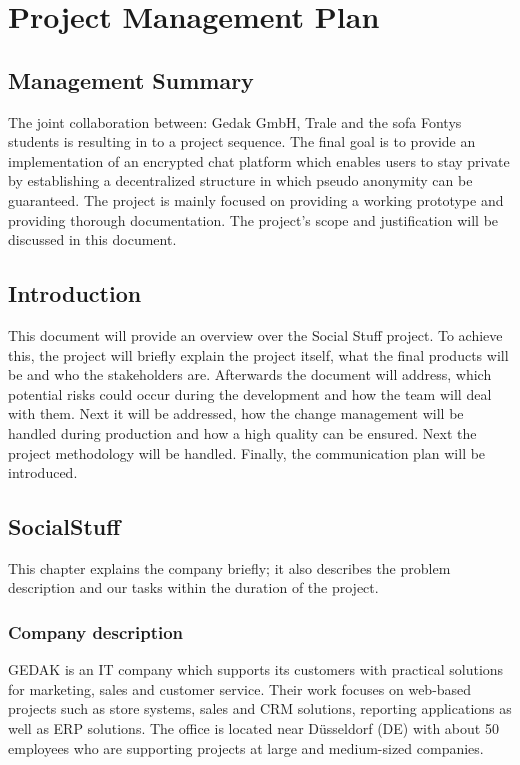 \section{Project Management Plan}\label{sec:project-management-plan}

\subsection{Management Summary}\label{subsec:management-summary}

The joint collaboration between: Gedak GmbH, Trale and the \ac{sofa} Fontys students is resulting in to a project
sequence.
The final goal is to provide an implementation of an encrypted chat platform which enables users to stay private by
establishing a decentralized structure in which pseudo anonymity can be guaranteed.
The project is mainly focused on providing a working prototype and providing thorough documentation.
The project's scope and justification will be discussed in this document.

\subsection{Introduction}\label{subsec:introduction}
This document will provide an overview over the Social Stuff project.
To achieve this, the project will briefly explain the project itself, what the final products will be and who the
stakeholders are.
Afterwards the document will address, which potential risks could occur during the development and how the team will
deal with them.
Next it will be addressed, how the change management will be handled during production and how a high quality can be
ensured.
Next the project methodology will be handled.
Finally, the communication plan will be introduced.

\subsection{SocialStuff}\label{subsec:socialstuff}

This chapter explains the company briefly;
it also describes the problem description and our tasks within the duration of the project.

\subsubsection{Company description}

GEDAK is an IT company which supports its customers with practical solutions for marketing, sales and customer service.
Their work focuses on web-based projects such as store systems, sales and CRM solutions, reporting applications as well
as ERP solutions.
The office is located near Düsseldorf (DE) with about 50 employees who are supporting projects at large and medium-sized
companies.

